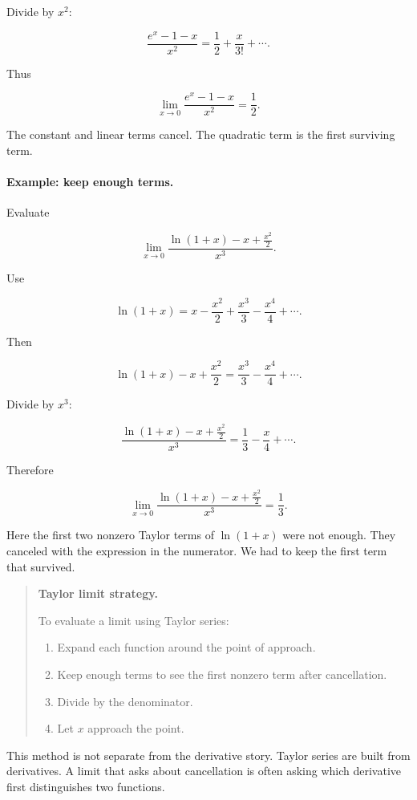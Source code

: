 Divide by \(x^2\):

\[
\frac{e^x-1-x}{x^2}
=
\frac12+\frac{x}{3!}+\cdots.
\]

Thus

\[
\boxed{
\lim_{x\to0}\frac{e^x-1-x}{x^2}=\frac12.
}
\]

The constant and linear terms cancel.  The quadratic term is the first surviving term.

\paragraph{Example: keep enough terms.}
Evaluate

\[
\lim_{x\to0}
\frac{\ln(1+x)-x+\frac{x^2}{2}}{x^3}.
\]

Use

\[
\ln(1+x)=
x-\frac{x^2}{2}+\frac{x^3}{3}-\frac{x^4}{4}+\cdots.
\]

Then

\[
\ln(1+x)-x+\frac{x^2}{2}
=
\frac{x^3}{3}-\frac{x^4}{4}+\cdots.
\]

Divide by \(x^3\):

\[
\frac{\ln(1+x)-x+\frac{x^2}{2}}{x^3}
=
\frac13-\frac{x}{4}+\cdots.
\]

Therefore

\[
\boxed{
\lim_{x\to0}
\frac{\ln(1+x)-x+\frac{x^2}{2}}{x^3}
=
\frac13.
}
\]

Here the first two nonzero Taylor terms of \(\ln(1+x)\) were not enough.  They canceled
with the expression in the numerator.  We had to keep the first term that survived.

\begin{quote}
\textbf{Taylor limit strategy.}

To evaluate a limit using Taylor series:

\begin{enumerate}
\item Expand each function around the point of approach.

\item Keep enough terms to see the first nonzero term after cancellation.

\item Divide by the denominator.

\item Let \(x\) approach the point.
\end{enumerate}
\end{quote}

This method is not separate from the derivative story.  Taylor series are built from
derivatives.  A limit that asks about cancellation is often asking which derivative first
distinguishes two functions.

